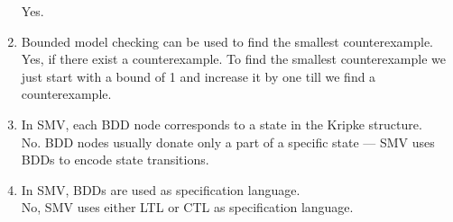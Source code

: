 \documentclass[a4paper, 11pt]{article}
\begin{document}
\begin{enumerate}[label=(\alph*)]
    Yes.

    \item Bounded model checking can be used to find the smallest counterexample.\\

    Yes, if there exist a counterexample. To find the smallest counterexample we just start with a bound of 1 and increase it by one till we find a counterexample.

    \item In SMV, each BDD node corresponds to a state in the Kripke structure.\\

    No. BDD nodes usually donate only a part of a specific state — SMV uses BDDs to encode state transitions.

    \item In SMV, BDDs are used as specification language.\\

    No, SMV uses either LTL or CTL as specification language.

\end{enumerate}


\titleformat{\section}{\sffamily\bfseries}{}{0pt}{}[{\color{aqua}\hrule}]
\printbibliography
\end{document}
